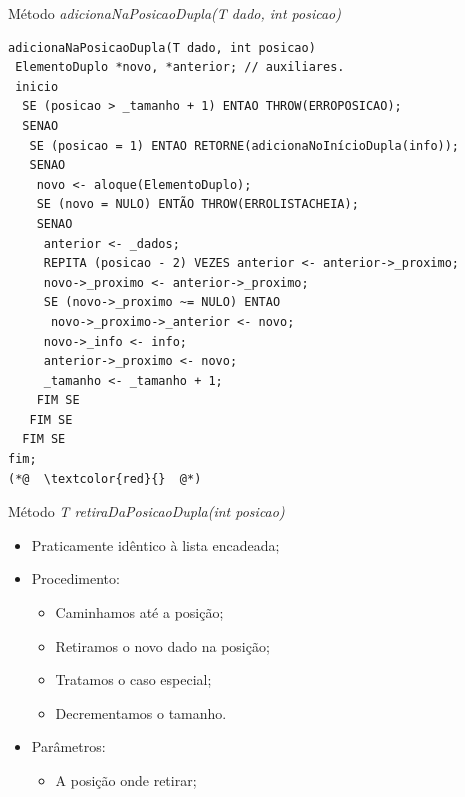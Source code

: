 \documentclass[12pt,table,xcolor={dvipsnames}]{beamer}
\begin{document}
\begin{frame}[fragile]{Método \textit{adicionaNaPosicaoDupla(T dado, int posicao)}}
\begin{lstlisting}
adicionaNaPosicaoDupla(T dado, int posicao)
 ElementoDuplo *novo, *anterior; // auxiliares.
 inicio
  SE (posicao > _tamanho + 1) ENTAO THROW(ERROPOSICAO);
  SENAO
   SE (posicao = 1) ENTAO RETORNE(adicionaNoInícioDupla(info));
   SENAO
    novo <- aloque(ElementoDuplo); 
    SE (novo = NULO) ENTÃO THROW(ERROLISTACHEIA);
    SENAO
     anterior <- _dados;
     REPITA (posicao - 2) VEZES anterior <- anterior->_proximo;
     novo->_proximo <- anterior->_proximo;
     SE (novo->_proximo ~= NULO) ENTAO  
      novo->_proximo->_anterior <- novo; 
     novo->_info <- info;
     anterior->_proximo <- novo;
     _tamanho <- _tamanho + 1;
    FIM SE
   FIM SE
  FIM SE
fim;
(*@  \textcolor{red}{}  @*)
\end{lstlisting}
\end{frame}

\begin{frame}[fragile]{Método \textit{T retiraDaPosicaoDupla(int posicao)}}

\begin{itemize}
\item Praticamente idêntico à lista encadeada;
\item Procedimento:
\begin{itemize}
\item Caminhamos até a posição;
\item Retiramos o novo dado na posição;
\item Tratamos o caso especial;
\item Decrementamos o tamanho.
\end{itemize}
\item Parâmetros:
\begin{itemize}
\item A posição onde retirar;
\end{itemize}
\end{itemize}
\end{frame}
\end{document}
